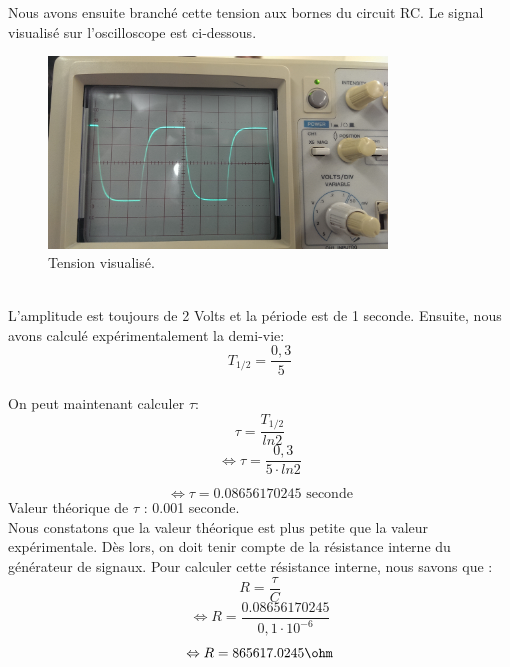 \documentclass{report}
\begin{document}
Nous avons ensuite branch\'e cette tension aux bornes du circuit RC. Le signal visualis\'e sur l'oscilloscope est ci-dessous.
\begin{figure}[ht!]
\centering
\includegraphics[width=90mm]{E244img2.jpg}
\caption{Tension visualis\'e.}
\label{overflow}
\end{figure}
\\
L'amplitude est toujours de 2 Volts et la p\'eriode est de 1 seconde.
Ensuite, nous avons calcul\'e exp\'erimentalement la demi-vie:
\begin{equation}
   T_{1/2} = \frac{0,3}{5}
\end{equation}
\pagebreak
\\
On peut maintenant calculer $\tau$:
\begin{equation}
   \tau = \frac{T_{1/2}}{ln2}
\end{equation}
\begin{equation}
   \Leftrightarrow \tau = \frac{0,3}{5 \cdot ln2} 
\end{equation}

\begin{equation}
   \Leftrightarrow \tau = 0.08656170245 \text{ seconde} 
\end{equation}
Valeur th\'eorique de $\tau$ : 0.001 seconde.
\\
Nous constatons que la valeur th\'eorique est plus petite que la valeur exp\'erimentale. D\`es lors, on doit tenir compte de la r\'esistance interne du g\'en\'erateur de signaux.
Pour calculer cette r\'esistance interne, nous savons que :
\begin{equation}
   R = \frac{\tau}{C} 
\end{equation}
\begin{equation}
  \Leftrightarrow R = \frac{0.08656170245}{0,1 \cdot 10^{-6}} 
\end{equation}
\begin{equation}
  \Leftrightarrow R = 865617.0245 \ohm
\end{equation}
\end{document}
